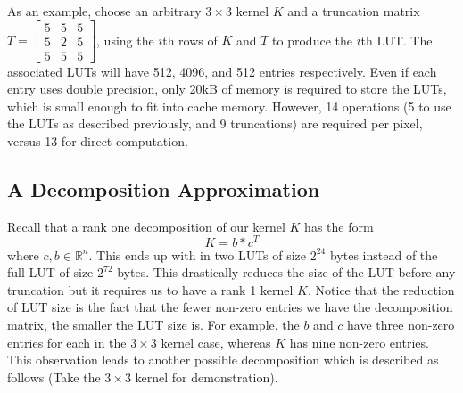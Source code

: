 \documentclass[12pt]{amsart}
\theoremstyle{definition}
\theoremstyle{remark}
\numberwithin{thm}{section}
\begin{document}
As an example, choose an arbitrary $3\times 3$ kernel $K$ and a truncation matrix $T = \left[\begin{smallmatrix}5 & 5 & 5\\5 & 2 & 5\\ 5 & 5 & 5\end{smallmatrix}\right]$, using the $i$th rows of $K$ and $T$ to produce the $i$th LUT. The associated LUTs will have 512, 4096, and 512 entries respectively. Even if each entry uses double precision, only 20kB of memory is required to store the LUTs, which is small enough to fit into cache memory. However, 14 operations (5 to use the LUTs as described previously, and 9 truncations) are required per pixel, versus 13 for direct computation. 

\subsection{A Decomposition Approximation}
Recall that a rank one decomposition of our kernel $K$ has the form 
$$
K=b*c^T
$$
where $c,b \in \mathbb{R}^n$. This ends up with in two LUTs of size $2^{24}$ bytes instead of the full LUT of size $2^{72}$ bytes. This drastically reduces the size of the LUT before any truncation but it requires us to have a rank 1 kernel $K$. Notice that the reduction of LUT size is the fact that the fewer non-zero entries we have the decomposition matrix, the smaller the LUT size is. For example, the $b$ and $c$ have three non-zero entries for each in the $3\times 3$ kernel case, whereas $K$ has nine non-zero entries. This observation leads to another possible decomposition which is described as follows (Take the $3\times 3$ kernel for demonstration). 
\end{document}
